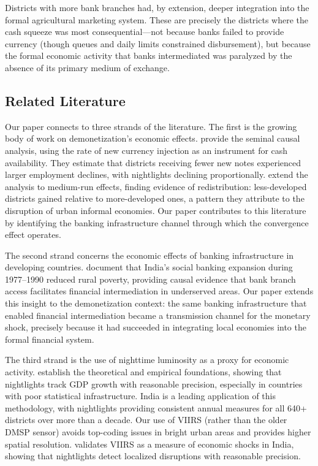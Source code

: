 \documentclass[12pt]{article}
\begin{document}
Districts with more bank branches had, by extension, deeper integration into the formal agricultural marketing system. These are precisely the districts where the cash squeeze was most consequential---not because banks failed to provide currency (though queues and daily limits constrained disbursement), but because the formal economic activity that banks intermediated was paralyzed by the absence of its primary medium of exchange.

\subsection{Related Literature}

Our paper connects to three strands of the literature. The first is the growing body of work on demonetization's economic effects. \citet{chodorow2020cash} provide the seminal causal analysis, using the rate of new currency injection as an instrument for cash availability. They estimate that districts receiving fewer new notes experienced larger employment declines, with nightlights declining proportionally. \citet{chanda2022was} extend the analysis to medium-run effects, finding evidence of redistribution: less-developed districts gained relative to more-developed ones, a pattern they attribute to the disruption of urban informal economies. Our paper contributes to this literature by identifying the banking infrastructure channel through which the convergence effect operates.

The second strand concerns the economic effects of banking infrastructure in developing countries. \citet{burgess2005can} document that India's social banking expansion during 1977--1990 reduced rural poverty, providing causal evidence that bank branch access facilitates financial intermediation in underserved areas. Our paper extends this insight to the demonetization context: the same banking infrastructure that enabled financial intermediation became a transmission channel for the monetary shock, precisely because it had succeeded in integrating local economies into the formal financial system.

The third strand is the use of nighttime luminosity as a proxy for economic activity. \citet{henderson2012measuring} establish the theoretical and empirical foundations, showing that nightlights track GDP growth with reasonable precision, especially in countries with poor statistical infrastructure. India is a leading application of this methodology, with nightlights providing consistent annual measures for all 640+ districts over more than a decade. Our use of VIIRS (rather than the older DMSP sensor) avoids top-coding issues in bright urban areas and provides higher spatial resolution. \citet{aggarwal2020lit} validates VIIRS as a measure of economic shocks in India, showing that nightlights detect localized disruptions with reasonable precision.
\end{document}
